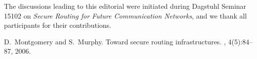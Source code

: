 \documentclass[sigconf]{acmart}
\begin{document}
\begin{acks}
	The discussions leading to this editorial were initiated during
	Dagstuhl Seminar 15102 on
	\emph{Secure Routing for Future Communication Networks},
	and we thank all participants for their contributions.
\end{acks}

{ \balance
{
	\begin{thebibliography}{1}

		D.~Montgomery and S.~Murphy.
		\newblock Toward secure routing infrastructures.
		, 4(5):84--87, 2006.

	\end{thebibliography}
}
}
\end{document}
